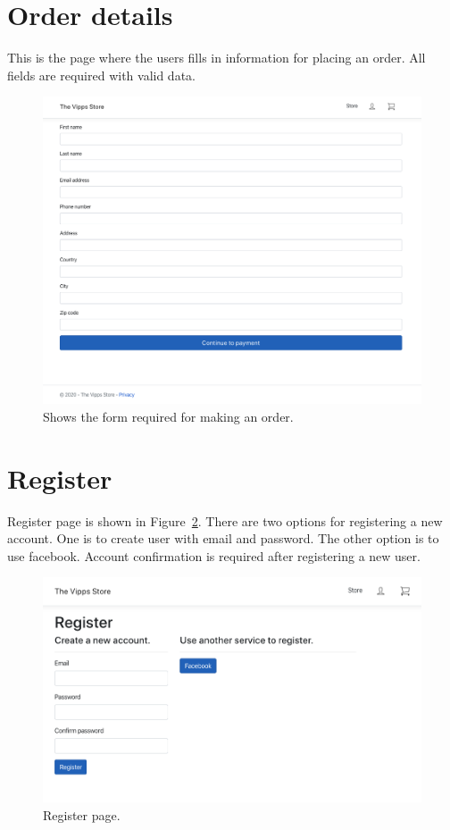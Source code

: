 \documentclass[11pt,a4paper,english]{article}
\begin{document}
\section*{Order details}
This is the page where the users fills in information for placing an order. All fields are required with valid data.
\begin{figure}[htbp]
  \centering
  \includegraphics[scale=0.2]{order}
  \caption{Shows the form required for making an order.}
  \label{fig:order}
\end{figure}
\section*{Register}
Register page is shown in Figure~\ref{fig:register}. There are two options for registering a new account. One is to create user with email and password. The other option is to use facebook. Account confirmation is required after registering a new user.
\begin{figure}[htbp]
  \centering
  \includegraphics[scale=0.3]{register}
  \caption{Register page.}
  \label{fig:register}
\end{figure}
\end{document}
